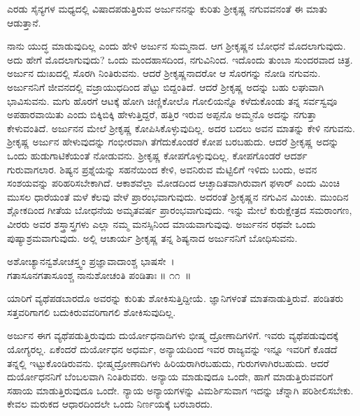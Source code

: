 \begin{artha}
ಎರಡು ಸೈನ್ಯಗಳ ಮಧ್ಯದಲ್ಲಿ ವಿಷಾದಪಡುತ್ತಿರುವ ಅರ್ಜುನನನ್ನು ಕುರಿತು ಶ‍್ರೀಕೃಷ್ಣ ನಗುವವನಂತೆ ಈ ಮಾತು ಆಡುತ್ತಾನೆ.
\end{artha}

ನಾನು ಯುದ್ಧ ಮಾಡುವುದಿಲ್ಲ ಎಂದು ಹೇಳಿ ಅರ್ಜುನ ಸುಮ್ಮನಾದ. ಆಗ ಶ‍್ರೀಕೃಷ್ಣನ ಬೋಧನೆ ಮೊದಲಾಗುವುದು. ಅದು ಹೇಗೆ ಮೊದಲಾಗುವುದು? ಒಂದು ಮಂದಹಾಸದಿಂದ, ನಗುವಿನಿಂದ. ಇದೊಂದು ತುಂಬಾ ಸುಂದರವಾದ ಚಿತ್ರ. ಅರ್ಜುನ ದುಃಖದಲ್ಲಿ ಸೊರಗಿ ನಿಂತಿರುವನು. ಆದರೆ ಶ‍್ರೀಕೃಷ್ಣನಾದರೋ ಆ ಸೊರಗನ್ನು ನೋಡಿ ನಗುವನು. ಅರ್ಜುನನಿಗೆ ಜೀವನದಲ್ಲಿ ವಜ್ರಾಯುಧದಿಂದ ಪೆಟ್ಟು ಬಿದ್ದಂತಿದೆ. ಆದರೆ ಶ‍್ರೀಕೃಷ್ಣ ಅದನ್ನು ಬಹು ಲಘುವಾಗಿ ಭಾವಿಸುವನು. ಮಗು ಹೊರಗೆ ಆಟಕ್ಕೆ ಹೋಗಿ ಚಿಣ್ಣಿಕೋಲೊ ಗೋಲಿಯನ್ನೊ ಕಳೆದುಕೊಂಡು ತನ್ನ ಸರ್ವಸ್ವವೂ ಅಪಹಾರವಾಯಿತು ಎಂದು ಬಿಕ್ಕಿಬಿಕ್ಕಿ ಹೇಳುತ್ತಿದ್ದರೆ, ಹತ್ತಿರ ಇರುವ ಅಪ್ಪನೊ ಅಮ್ಮನೊ ಅದನ್ನು ನಗುತ್ತಾ ಕೇಳುವಂತಿದೆ. ಅರ್ಜುನನ ಮೇಲೆ ಶ‍್ರೀಕೃಷ್ಣ ಕೋಪಿಸಿಕೊಳ್ಳುವುದಿಲ್ಲ. ಅದರ ಬದಲು ಅವನ ಮಾತನ್ನು ಕೇಳಿ ನಗುವನು. ಶ‍್ರೀಕೃಷ್ಣ ಅರ್ಜುನ ಹೇಳುವುದನ್ನು ಗಂಭೀರವಾಗಿ ತೆಗೆದುಕೊಂಡರೆ ಕೋಪ ಬರಬಹುದು. ಆದರೆ ಶ‍್ರೀಕೃಷ್ಣ ಅದನ್ನು ಒಂದು ಹುಡುಗಾಟಿಕೆಯಂತೆ ನೋಡುವನು. ಶ‍್ರೀಕೃಷ್ಣ ಕೋಪಗೊಳ್ಳುವುದಿಲ್ಲ. ಕೋಪಗೊಂಡರೆ ಆದರ್ಶ ಗುರುವಾಗಲಾರ. ಶಿಷ್ಯನ ಪ್ರಶ್ನೆಯನ್ನು ಸಹನೆಯಿಂದ ಕೇಳಿ, ಅವನಿರುವ ಮೆಟ್ಟಿಲಿಗೆ ಇಳಿದು ಬಂದು, ಅವನ ಸಂಶಯವನ್ನು ಪರಿಹರಿಸಬೇಕಾಗಿದೆ. ಆಕಾಶವೆಲ್ಲಾ ಮೋಡದಿಂದ ಆಚ್ಛಾದಿತವಾಗಿರುವಾಗ ಫಳಾರ್ ಎಂದು ಮಿಂಚಿ ಮುಸಲ ಧಾರೆಯಂತೆ ಮಳೆ ಕೆಲವು ವೇಳೆ ಪ್ರಾರಂಭವಾಗುವುದು. ಅದರಂತೆ ಶ‍್ರೀಕೃಷ್ಣನ ನಗುವಿನ ಮಿಂಚು. ಮುಂದಿನ ಶ್ಲೋಕದಿಂದ ಗೀತೆಯ ಬೋಧನೆಯ ಅಮೃತವರ್ಷ ಪ್ರಾರಂಭವಾಗುವುದು. ಇನ್ನು ಮೇಲೆ ಕುರುಕ್ಷೇತ್ರದ ಸಮರಾಂಗಣ, ವೀರರು ಅವರ ಶಸ್ತ್ರಾಸ್ತ್ರಗಳು ಎಲ್ಲಾ ನಮ್ಮ ಮನಸ್ಸಿನಿಂದ ಮಾಯವಾಗುವುವು. ಅರ್ಜುನನ ರಥವೇ ಒಂದು ಪುಷ್ಯಾಶ್ರಮವಾಗುವುದು. ಅಲ್ಲಿ ಆಚಾರ್ಯ ಶ‍್ರೀಕೃಷ್ಣ ತನ್ನ ಶಿಷ್ಯನಾದ ಅರ್ಜುನನಿಗೆ ಬೋಧಿಸುವನು.

\begin{shloka}
ಅಶೋಚ್ಯಾನನ್ವಶೋಚಸ್ತ್ವಂ ಪ್ರಜ್ಞಾವಾದಾಂಶ್ಚ ಭಾಷಸೇ~।\\ಗತಾಸೂನಗತಾಸೂಂಶ್ಚ ನಾನುಶೋಚಂತಿ ಪಂಡಿತಾಃ \hfill॥ ೧೧~॥
\end{shloka}

\begin{artha}
ಯಾರಿಗೆ ವ್ಯಥೆಪಡಬಾರದೊ ಅವರನ್ನು ಕುರಿತು ಶೋಕಿಸುತ್ತಿದ್ದೀಯೆ. ಜ್ಞಾನಿಗಳಂತೆ ಮಾತ\-ನಾಡುತ್ತಿರುವೆ. ಪಂಡಿತರು ಸತ್ತವರಿಗಾಗಲಿ ಬದುಕಿರುವವರಿಗಾಗಲಿ ಶೋಕಿಸುವುದಿಲ್ಲ.
\end{artha}

ಅರ್ಜುನ ಈಗ ವ್ಯಥೆಪಡುತ್ತಿರುವುದು ದುರ್ಯೋಧನಾದಿಗಳು ಭೀಷ್ಮ ದ್ರೋಣಾದಿಗಳಿಗೆ. ಇವರು ವ್ಯಥೆಪಡುವುದಕ್ಕೆ ಯೋಗ್ಯರಲ್ಲ. ಏಕೆಂದರೆ ದುರ್ಯೋಧನ ಅಧರ್ಮ, ಅನ್ಯಾಯದಿಂದ ಇವರ ರಾಜ್ಯವನ್ನು ಇನ್ನೂ ಇವರಿಗೆ ಕೊಡದೆ ತನ್ನಲ್ಲಿ ಇಟ್ಟುಕೊಂಡಿರುವನು. ಭೀಷ್ಮದ್ರೋಣಾದಿಗಳು ಹಿರಿಯರಾಗಿರಬಹುದು, ಗುರುಗಳಾಗಿರಬಹುದು. ಆದರೆ ದುರ್ಯೋಧನನಿಗೆ ಬೆಂಬಲವಾಗಿ ನಿಂತಿರುವರು. ಅನ್ಯಾಯ ಮಾಡುವುದೂ ಒಂದೇ, ಹಾಗೆ ಮಾಡುತ್ತಿರುವವರಿಗೆ ಸಹಾಯ ಮಾಡುತ್ತಿರುವುದೂ ಒಂದೇ. ನ್ಯಾಯ ಅನ್ಯಾಯಗಳನ್ನು ವಿಮರ್ಶಿಸುವಾಗ ಇದನ್ನು ಚೆನ್ನಾಗಿ ಪರಿಶೀಲಿಸಬೇಕು. ಕೇವಲ ಮರುಕದ ಆಧಾರದಿಂದಲೇ ಒಂದು ನಿರ್ಣಯಕ್ಕೆ ಬರಬಾರದು.

